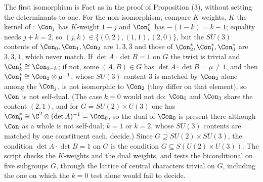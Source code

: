 The first isomorphism is Fact  as in the proof of Proposition (3), without setting the determinants to one. For the non-isomorphism, compare $K$-weights, $K$ the kernel of : $\Con_{j}$ has $K$-weight $1 - j$ and $\Con_{k}^{*}$ has $-(1 - k) = k - 1$; equality needs $j + k = 2$, so $(j, k) \in \{(0,2), (1,1), (2,0)\}$, but the $SU(3)$ contents of $\Con_{0}, \Con_{1}, \Con_{2}$ are $1, 3, \bar{3}$ and those of $\Con_{2}^{*}, \Con_{1}^{*}, \Con_{0}^{*}$ are $3, \bar{3}, 1$, which never match. If $\det A \cdot \det B = 1$ on $G$ the twist is trivial and $\Con_{k}^{*} \cong \Con_{3-k}$; if not, some $(A, B) \in G$ has $\det A \cdot \det B = \mu \neq 1$, and then $\Con_{1}^{*} \cong \Con_{2} \otimes \mu^{-1}$, whose $SU(3)$ content $\bar{3}$ is matched by $\Con_{2}$ alone among the $\Con_{j}$, is not isomorphic to $\Con_{2}$ (they differ on that element), so $\Con$ is not self-dual. (The case $k = 0$ would not do: $\Con_{0}$ and $\Con_{3}$ share the content $(2,1)$, and for $G = SU(2) \times U(3)$ one has $\Con_{0}^{*} \cong \C^{2} \otimes (\det A)^{-1} = \Con_{0}$, so the dual of $\Con_{0}$ is present there although $\Con$ as a whole is not self-dual; $k = 1$ or $k = 2$, whose $SU(3)$ contents are matched by one constituent each, decide.) Since $G \supseteq SU(2) \times SU(3)$, the condition $\det A \cdot \det B = 1$ on $G$ is the condition $G \subseteq S(U(2) \times U(3))$. The script checks the $K$-weights and the dual weights, and tests the biconditional on five subgroups $G$, through the lattice of central characters trivial on $G$, including the one on which the $k = 0$ test alone would fail to decide.
